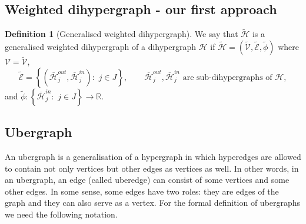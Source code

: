 \documentclass[a4paper,12pt]{article}
\theoremstyle{definition}
\newtheorem{definition}{Definition}%
\theoremstyle{remark}
\newcommand{\HH}{\mathcal{H}}
\newcommand{\bHH}{\overline{\mathcal{H}}}
\newcommand{\tHH}{\tilde{\mathcal{H}}}
\newcommand{\V}{\mathcal{V}}
\newcommand{\tV}{\tilde{\mathcal{V}}}
\newcommand{\tE}{\tilde{\mathcal{E}}}
\newcommand{\tphi}{\tilde{\phi}}
\newcommand{\RR}{\mathbb{R}}
\begin{document}
\subsection{Weighted dihypergraph - our first approach}

\begin{definition}[Generalised weighted dihypergraph]
We say that $\tHH$ is a generalised weighted dihypergraph of a dihypergraph $\HH$ if $\tHH=\left(\tV, \tE, \tphi\right)$ where $\V=\tV$, 
\[
\tE=\left\{\left(\bHH^{out}_j,\bHH^{in}_j\right):\,\,j\in J\right\}, \qquad  \bHH^{out}_j,\bHH^{in}_j\text{ are sub-dihypergraphs of}\,\, \HH,
\]
and $\tphi:\left\{\bHH^{in}_j:\,\, j\in J\right\}\rightarrow \RR$.
\end{definition}

\subsection{Ubergraph}
An ubergraph \cite{Joslyn2017UbergraphsAD} is a generalisation of a hypergraph in which hyperedges are allowed to contain not only vertices but other edges as vertices as well. In other words, in an ubergraph, an edge (called uberedge) can consist of some vertices and some other edges. In some sense, some edges have two roles: they are edges of the graph and they can also serve as a vertex. For the formal definition of ubergraphs we need the following notation.  
\end{document}

